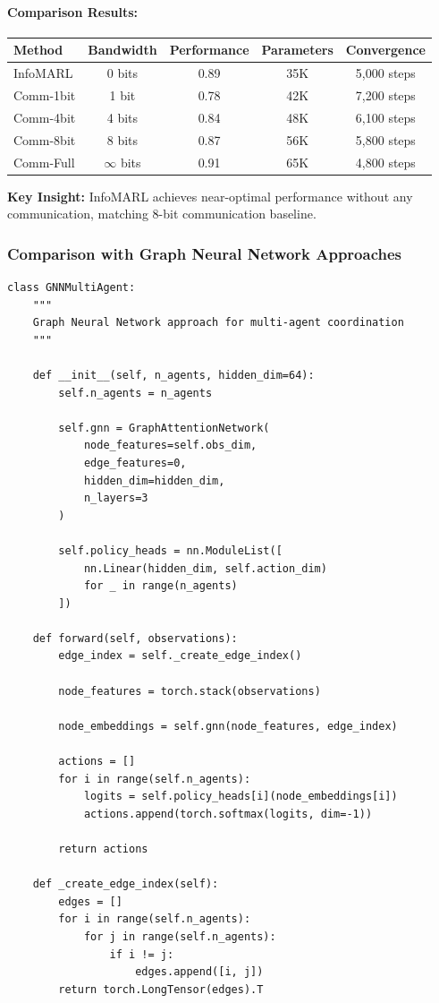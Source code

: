 \documentclass[10pt, letterpaper]{article}
\begin{document}
\paragraph{Comparison Results:}

\begin{center}
\begin{tabular}{lcccc}
\toprule
\textbf{Method} & \textbf{Bandwidth} & \textbf{Performance} & \textbf{Parameters} & \textbf{Convergence} \\
\midrule
InfoMARL & 0 bits & 0.89 & 35K & 5,000 steps \\
Comm-1bit & 1 bit & 0.78 & 42K & 7,200 steps \\
Comm-4bit & 4 bits & 0.84 & 48K & 6,100 steps \\
Comm-8bit & 8 bits & 0.87 & 56K & 5,800 steps \\
Comm-Full & $\infty$ bits & 0.91 & 65K & 4,800 steps \\
\bottomrule
\end{tabular}
\end{center}

\textbf{Key Insight:} InfoMARL achieves near-optimal performance without any communication, matching 8-bit communication baseline.

\subsubsection{Comparison with Graph Neural Network Approaches}

\begin{lstlisting}
class GNNMultiAgent:
    """
    Graph Neural Network approach for multi-agent coordination
    """

    def __init__(self, n_agents, hidden_dim=64):
        self.n_agents = n_agents

        self.gnn = GraphAttentionNetwork(
            node_features=self.obs_dim,
            edge_features=0,
            hidden_dim=hidden_dim,
            n_layers=3
        )

        self.policy_heads = nn.ModuleList([
            nn.Linear(hidden_dim, self.action_dim)
            for _ in range(n_agents)
        ])

    def forward(self, observations):
        edge_index = self._create_edge_index()

        node_features = torch.stack(observations)

        node_embeddings = self.gnn(node_features, edge_index)

        actions = []
        for i in range(self.n_agents):
            logits = self.policy_heads[i](node_embeddings[i])
            actions.append(torch.softmax(logits, dim=-1))

        return actions

    def _create_edge_index(self):
        edges = []
        for i in range(self.n_agents):
            for j in range(self.n_agents):
                if i != j:
                    edges.append([i, j])
        return torch.LongTensor(edges).T
\end{lstlisting}
\end{document}
